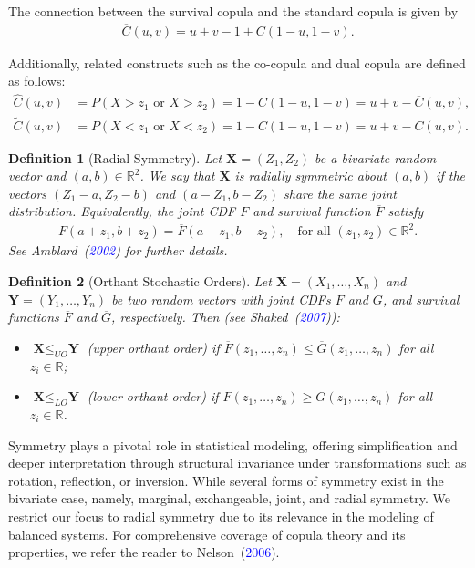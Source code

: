 \documentclass[12pt, a4paper]{article}
\numberwithin{equation}{section}
\newtheorem{definition}{Definition}[section]
\begin{document}
The connection between the survival copula and the standard copula is given by
\begin{align}
	\overline{C}(u,v) = u + v - 1 + C(1 - u, 1 - v).
\end{align}

Additionally, related constructs such as the co-copula and dual copula are defined as follows:
\begin{align}
	\widehat{C}(u,v) &= P(X > z_1 \text{ or } X > z_2) = 1 - C(1 - u, 1 - v) = u + v - \overline{C}(u,v), \\
	\widetilde{C}(u,v) &= P(X < z_1 \text{ or } X < z_2) = 1 - \overline{C}(1 - u, 1 - v) = u + v - C(u,v).
\end{align}

\begin{definition}[Radial Symmetry]
	Let $\textbf{X} = (Z_1,Z_2)$ be a bivariate random vector and $(a,b) \in \mathbb{R}^2$. We say that $\textbf{X}$ is radially symmetric about $(a,b)$ if the vectors $(Z_1 - a, Z_2 - b)$ and $(a - Z_1, b - Z_2)$ share the same joint distribution. Equivalently, the joint CDF $F$ and survival function $\overline{F}$ satisfy
	\begin{align}
		F(a + z_1, b + z_2) = \overline{F}(a - z_1, b - z_2), \quad \text{for all } (z_1, z_2) \in \mathbb{R}^2.
	\end{align}
	See Amblard~(\textcolor{blue}{2002}) for further details.
\end{definition}

\begin{definition}[Orthant Stochastic Orders]
	Let $\textbf{X} = (X_1, \ldots, X_n)$ and $\textbf{Y} = (Y_1, \ldots, Y_n)$ be two random vectors with joint CDFs $F$ and $G$, and survival functions $\overline{F}$ and $\overline{G}$, respectively. Then (see Shaked~(\textcolor{blue}{2007})):
	\begin{itemize}
		\item $\textbf{X} \le_{UO} \textbf{Y}$ (upper orthant order) if $\overline{F}(z_1,\ldots,z_n) \le \overline{G}(z_1,\ldots,z_n)$ for all $z_i \in \mathbb{R}$;
		\item $\textbf{X} \le_{LO} \textbf{Y}$ (lower orthant order) if $F(z_1,\ldots,z_n) \ge G(z_1,\ldots,z_n)$ for all $z_i \in \mathbb{R}$.
	\end{itemize}
\end{definition}
Symmetry plays a pivotal role in statistical modeling, offering simplification and deeper interpretation through structural invariance under transformations such as rotation, reflection, or inversion. While several forms of symmetry exist in the bivariate case, namely, marginal, exchangeable, joint, and radial symmetry. We restrict our focus to radial symmetry due to its relevance in the modeling of balanced systems.
For comprehensive coverage of copula theory and its properties, we refer the reader to Nelson~(\textcolor{blue}{2006}).
\end{document}
